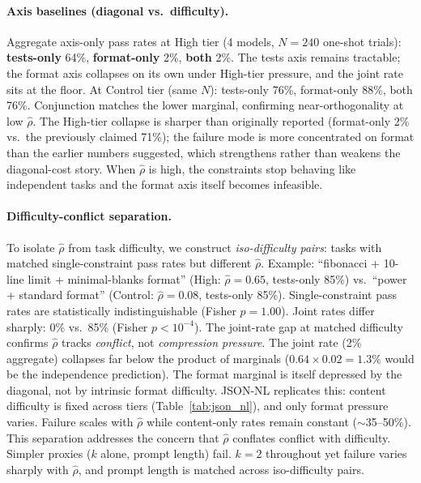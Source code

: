 \documentclass{article}
\theoremstyle{plain}
\theoremstyle{definition}
\theoremstyle{remark}
\newcommand{\rhohat}{\hat{\rho}}
\begin{document}
\paragraph{Axis baselines (diagonal vs.\ difficulty).}
Aggregate axis-only pass rates at High tier (4 models, $N{=}240$ one-shot trials): \textbf{tests-only} 64\%, \textbf{format-only} 2\%, \textbf{both} 2\%. The tests axis remains tractable; the format axis collapses on its own under High-tier pressure, and the joint rate sits at the floor. At Control tier (same $N$): tests-only 76\%, format-only 88\%, both 76\%. Conjunction matches the lower marginal, confirming near-orthogonality at low $\rhohat$. The High-tier collapse is sharper than originally reported (format-only 2\% vs.\ the previously claimed 71\%); the failure mode is more concentrated on format than the earlier numbers suggested, which strengthens rather than weakens the diagonal-cost story. When $\rhohat$ is high, the constraints stop behaving like independent tasks and the format axis itself becomes infeasible.

\paragraph{Difficulty-conflict separation.}
To isolate $\rhohat$ from task difficulty, we construct \emph{iso-difficulty pairs}: tasks with matched single-constraint pass rates but different $\rhohat$. Example: ``fibonacci + 10-line limit + minimal-blanks format'' (High: $\rhohat{=}0.65$, tests-only 85\%) vs.\ ``power + standard format'' (Control: $\rhohat{=}0.08$, tests-only 85\%). Single-constraint pass rates are statistically indistinguishable (Fisher $p{=}1.00$). Joint rates differ sharply: 0\% vs.\ 85\% (Fisher $p < 10^{-4}$). The joint-rate gap at matched difficulty confirms $\rhohat$ tracks \emph{conflict}, not \emph{compression pressure}. The joint rate (2\% aggregate) collapses far below the product of marginals ($0.64 \times 0.02 = 1.3\%$ would be the independence prediction). The format marginal is itself depressed by the diagonal, not by intrinsic format difficulty. JSON-NL replicates this: content difficulty is fixed across tiers (Table~\ref{tab:json_nl}), and only format pressure varies. Failure scales with $\rhohat$ while content-only rates remain constant ($\sim$35--50\%). This separation addresses the concern that $\rhohat$ conflates conflict with difficulty. Simpler proxies ($k$ alone, prompt length) fail. $k{=}2$ throughout yet failure varies sharply with $\rhohat$, and prompt length is matched across iso-difficulty pairs.
\end{document}
